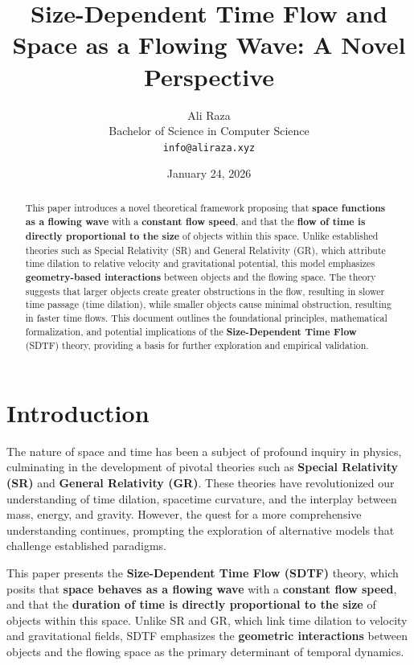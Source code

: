 \documentclass[12pt]{article}
\title{Size-Dependent Time Flow and Space as a Flowing Wave: A Novel Perspective}
\author{Ali Raza\\
Bachelor of Science in Computer Science\\
\texttt{info@aliraza.xyz}}
\date{January 24, 2026}
\begin{document}
\maketitle

\begin{abstract}
This paper introduces a novel theoretical framework proposing that \textbf{space functions as a flowing wave} with a \textbf{constant flow speed}, and that the \textbf{flow of time is directly proportional to the size} of objects within this space. Unlike established theories such as Special Relativity (SR) and General Relativity (GR), which attribute time dilation to relative velocity and gravitational potential, this model emphasizes \textbf{geometry-based interactions} between objects and the flowing space. The theory suggests that larger objects create greater obstructions in the flow, resulting in slower time passage (time dilation), while smaller objects cause minimal obstruction, resulting in faster time flows. This document outlines the foundational principles, mathematical formalization, and potential implications of the \textbf{Size-Dependent Time Flow} (SDTF) theory, providing a basis for further exploration and empirical validation.
\end{abstract}

\newpage

\tableofcontents

\newpage

\section{Introduction}

The nature of space and time has been a subject of profound inquiry in physics, culminating in the development of pivotal theories such as \textbf{Special Relativity (SR)} and \textbf{General Relativity (GR)}. These theories have revolutionized our understanding of time dilation, spacetime curvature, and the interplay between mass, energy, and gravity. However, the quest for a more comprehensive understanding continues, prompting the exploration of alternative models that challenge established paradigms.

This paper presents the \textbf{Size-Dependent Time Flow (SDTF)} theory, which posits that \textbf{space behaves as a flowing wave} with a \textbf{constant flow speed}, and that the \textbf{duration of time is directly proportional to the size} of objects within this space. Unlike SR and GR, which link time dilation to velocity and gravitational fields, SDTF emphasizes the \textbf{geometric interactions} between objects and the flowing space as the primary determinant of temporal dynamics.
\end{document}
